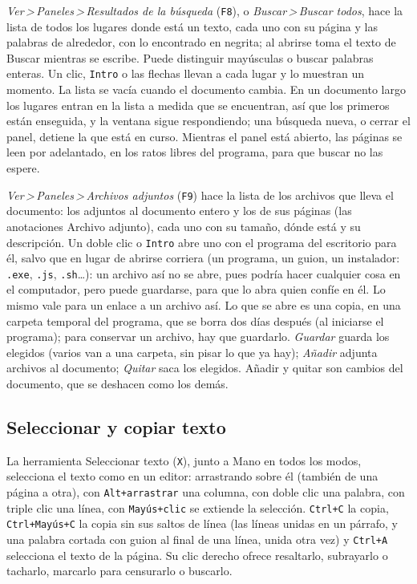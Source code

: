 \documentclass[12pt,
              article,
              oneside
              ]{memoir}
\newcommand*{\menu}[1]{\textit{#1}}
\newcommand*{\then}{\,>\,}
\newcommand*{\key}[1]{\texttt{#1}}
\begin{document}
%
\menu{Ver\then Paneles\then Resultados de la búsqueda} (\key{F8}), o
\menu{Buscar\then Buscar todos}, hace la lista de todos los lugares
donde está un texto, cada uno con su página y las palabras de alrededor, con
lo encontrado en negrita; al abrirse toma el texto de Buscar mientras se escribe.
Puede distinguir mayúsculas o buscar palabras enteras. Un clic, \key{Intro}
o las flechas llevan a cada lugar y lo muestran un momento. La lista se
vacía cuando el documento cambia. En un documento largo los lugares entran
en la lista a medida que se encuentran, así que los primeros están enseguida,
y la ventana sigue respondiendo; una búsqueda nueva, o cerrar el panel,
detiene la que está en curso. Mientras el panel está abierto, las páginas se
leen por adelantado, en los ratos libres del programa, para que buscar no
las espere.

%
\menu{Ver\then Paneles\then Archivos adjuntos} (\key{F9}) hace la lista de
los archivos que lleva el documento: los adjuntos al documento entero y los
de sus páginas (las anotaciones Archivo adjunto), cada uno con su tamaño,
dónde está y su descripción. Un doble clic o \key{Intro} abre uno con el
programa del escritorio para él, salvo que en lugar de abrirse corriera (un
programa, un guion, un instalador: \texttt{.exe}, \texttt{.js},
\texttt{.sh}\dots): un archivo así no se abre, pues podría hacer cualquier
cosa en el computador, pero puede guardarse, para que lo abra quien confíe en
él. Lo mismo vale para un enlace a un archivo así. Lo que se abre es una
copia, en una carpeta temporal del programa, que se borra dos días después
(al iniciarse el programa); para conservar un archivo, hay que guardarlo.
\menu{Guardar} guarda los elegidos (varios
van a una carpeta, sin pisar lo que ya hay); \menu{Añadir} adjunta archivos
al documento; \menu{Quitar} saca los elegidos. Añadir y quitar son cambios
del documento, que se deshacen como los demás.

\subsection{Seleccionar y copiar texto}

%
La herramienta Seleccionar texto (\key{X}), junto a Mano en todos los
modos, selecciona el texto como en un editor: arrastrando sobre él (también
de una página a otra), con \key{Alt+arrastrar} una columna, con doble clic
una palabra, con triple clic una línea, con \key{Mayús+clic} se extiende la
selección. \key{Ctrl+C} la copia, \key{Ctrl+Mayús+C} la copia sin sus saltos
de línea (las líneas unidas en un párrafo, y una palabra cortada con guion
al final de una línea, unida otra vez) y \key{Ctrl+A} selecciona el texto
de la página. Su clic derecho ofrece resaltarlo, subrayarlo o tacharlo, marcarlo
para censurarlo o buscarlo.
\end{document}
